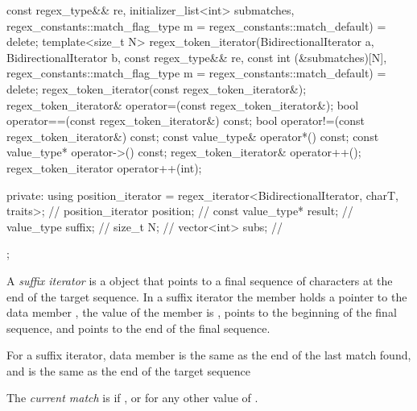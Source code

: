 \begin{codeblock}
{{                           const regex_type&& re,
                           initializer_list<int> submatches,
                           regex_constants::match_flag_type m =
                             regex_constants::match_default) = delete;
      template<size_t N>
      regex_token_iterator(BidirectionalIterator a, BidirectionalIterator b,
                           const regex_type&& re,
                           const int (&submatches)[N],
                           regex_constants::match_flag_type m =
                             regex_constants::match_default) = delete;
      regex_token_iterator(const regex_token_iterator&);
      regex_token_iterator& operator=(const regex_token_iterator&);
      bool operator==(const regex_token_iterator&) const;
      bool operator!=(const regex_token_iterator&) const;
      const value_type& operator*() const;
      const value_type* operator->() const;
      regex_token_iterator& operator++();
      regex_token_iterator operator++(int);

    private:
      using position_iterator =
            regex_iterator<BidirectionalIterator, charT, traits>; // \expos
      position_iterator position;                                 // \expos
      const value_type* result;                                   // \expos
      value_type suffix;                                          // \expos
      size_t N;                                                   // \expos
      vector<int> subs;                                           // \expos
    };
}
\end{codeblock}

\pnum
A \textit{suffix iterator} is a  object
that points to a final sequence of characters at
the end of the target sequence. In a suffix iterator the
member  holds a pointer to the data
member , the value of the member 
is ,  points to the beginning of the
final sequence, and  points to the end of the
final sequence.

\pnum
\begin{note} For a suffix iterator, data
member  is the same as the end of the last match
found, and  is the same as the end of the target
sequence \end{note}

\pnum
The \textit{current match} is  if , or
 for any other value of .


